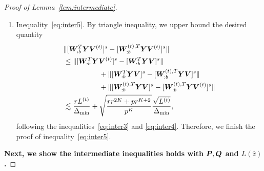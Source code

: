 \documentclass[journal]{IEEEtran}
\theoremstyle{definition}
\theoremstyle{definition}
\begin{document}
\begin{proof}[Proof of Lemma~\ref{lem:intermediate}]
\begin{enumerate}[wide]
    
    For $J_2$ and $J_3$, recall that $\onormSize{}{\mW_{:b}^{(t),T} \mX \mV }$ and $\onormSize{}{\mW_{:b}^{(t),T} \mX \mV^{(t)} }$ are lower bounded by inequalities~\eqref{eq:i11_sin_dom} and \eqref{eq:j11_wxvt}, respectively. By triangle inequality and inequality \eqref{eq:cond1} in Condition~\ref{cond:origin}, we have 
    \begin{equation}\label{eq:j2}
        J_2 \leq \frac{ \onormSize{}{\mW_{:b}^{(t),T} \mE \mV}  }{  \onormSize{}{\mW_{:b}^{(t),T} \mX \mV} } \lesssim \onormSize{}{\mW_{:b}^{(t),T} \mE \mV} \lesssim \frac{r^K}{p^{K/2}},
    \end{equation}
    and 
    \begin{equation}\label{eq:j3}
        J_3 \leq \frac{ \onormSize{}{\mW_{:b}^{(t),T} \mE \mV^{(t)}}  }{  \onormSize{}{\mW_{:b}^{(t),T} \mX \mV^{(t)}} } \lesssim \onormSize{}{\mW_{:b}^{(t),T} \mE \mV} \lesssim \frac{r^K}{p^{K/2}}.
    \end{equation}
    
    Therefore, combining the inequalities~\eqref{eq:j1}, \eqref{eq:j2}, and \eqref{eq:j3}, we finish the proof of inequality~\eqref{eq:inter4}. 
    
    

    \item Inequality~\eqref{eq:inter5}. By triangle inequality, we upper bound the desired quantity 
    \begin{align}
        &\lVert [ \bm{W}_{:b}^T \bm Y \bm{V}^{(t)} ]^s   -  [ \bm{W}_{:b}^{(t), T} \bm Y \bm{V}^{(t)} ]^s \rVert \\
        &\leq \lVert[ \bm{W}_{:b}^T \bm Y \bm{V}^{(t)} ]^s - [ \bm{W}_{:b}^T \bm Y \bm{V} ]^s \rVert \\ & \quad \quad \quad\quad\quad + \lVert[\bm{W}_{:b}^T \bm Y \bm{V} ]^s  - [ \bm{W}_{:b}^{(t),T} \bm Y \bm{V} ]^s \rVert \\
        & \quad \quad \quad\quad\quad+ \lVert[\bm{W}_{:b}^{(t),T} \bm Y \bm{V} ]^s  -  [\bm{W}_{:b}^{(t), T} \bm Y \bm{V}^{(t)} ]^s \rVert\\
        &\lesssim \frac{r L^{(t)}}{\Delta_{\min}} + \sqrt{ \frac{rr^{2K} + p r^{K+2}}{p^{K}}}  \frac{\sqrt{L^{(t)}}}{\Delta_{\min}},
    \end{align}
    \normalsize
    following the inequalities~\eqref{eq:inter3} and \eqref{eq:inter4}. Therefore, we finish the proof of inequality~\eqref{eq:inter5}.
        \end{enumerate}
  {
    
  \textbf{Next, we show the intermediate inequalities holds with $\bm{P}, \bm{Q}$ and $L(\hat z)$.}
        
}
\end{proof}
\end{document}
